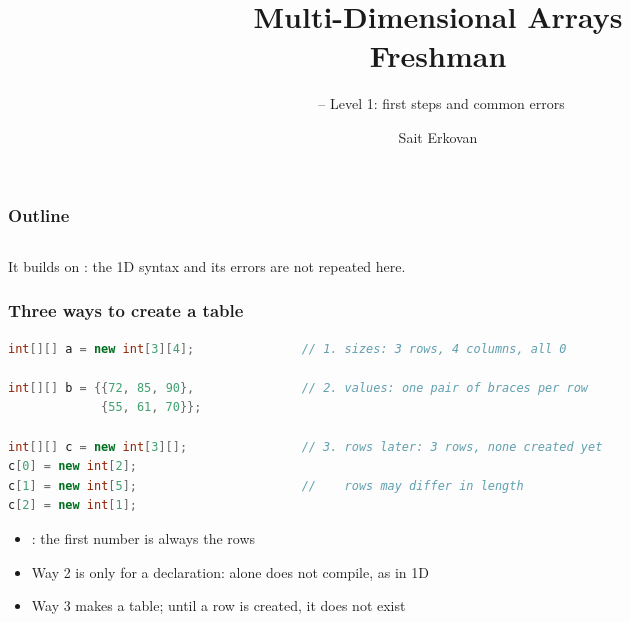 \documentclass[aspectratio=169,10pt,compress]{beamer}
\title[Arrays ND: Freshman]{
	Multi-Dimensional Arrays\\
	Freshman
}
\subtitle{
	\cisOOO\ -- Level 1: first steps and common errors
}
\author[Erkovan]{Sait Erkovan}
\institute[FCIS]{
	Faculty of Computer and Information Sciences\\
	Yeditepe University
}
\date{{\tiny \hbTimeStamp}}
\begin{document}
\begin{frame}[t,fragile]
	\titlepage
\end{frame}




\begin{frame}[t,fragile] \frametitle{Outline}
	\begin{columns}[T]
		\begin{column}{0.48\textwidth}
			\tableofcontents[sections={1-3}, hideallsubsections]
		\end{column}
		\begin{column}{0.48\textwidth}
			\tableofcontents[sections={4-7}, hideallsubsections]
		\end{column}
	\end{columns}

	\vspace{1em}
	\small It builds on : the 1D syntax and its errors are not repeated here.
\end{frame}








\begin{frame}[t,fragile] \frametitle{Three ways to create a table}


\begin{lstlisting}[style=codesnippet, language=Java]
int[][] a = new int[3][4];               // 1. sizes: 3 rows, 4 columns, all 0

int[][] b = {{72, 85, 90},               // 2. values: one pair of braces per row
             {55, 61, 70}};

int[][] c = new int[3][];                // 3. rows later: 3 rows, none created yet
c[0] = new int[2];
c[1] = new int[5];                       //    rows may differ in length
c[2] = new int[1];
\end{lstlisting}


	\begin{itemize}\small
		\item \hCode{[rows][columns]}: the first number is always the rows
		\item Way 2 is only for a declaration:  alone does not compile, as in 1D
		\item Way 3 makes a  table; until a row is created, it does not exist
	\end{itemize}
\end{frame}
\end{document}
